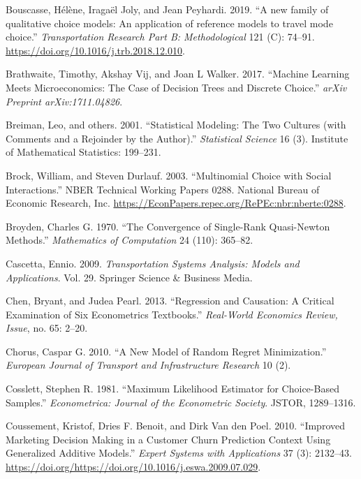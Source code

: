 \documentclass[12pt,]{article}
\begin{document}
\leavevmode\hypertarget{ref-joly2019qcm}{}%
Bouscasse, Hélène, Iragaël Joly, and Jean Peyhardi. 2019. ``A new family
of qualitative choice models: An application of reference models to
travel mode choice.'' \emph{Transportation Research Part B:
Methodological} 121 (C): 74--91.
\url{https://doi.org/10.1016/j.trb.2018.12.010}.

\leavevmode\hypertarget{ref-brathwaite2017machine}{}%
Brathwaite, Timothy, Akshay Vij, and Joan L Walker. 2017. ``Machine
Learning Meets Microeconomics: The Case of Decision Trees and Discrete
Choice.'' \emph{arXiv Preprint arXiv:1711.04826}.

\leavevmode\hypertarget{ref-breiman2001stat}{}%
Breiman, Leo, and others. 2001. ``Statistical Modeling: The Two Cultures
(with Comments and a Rejoinder by the Author).'' \emph{Statistical
Science} 16 (3). Institute of Mathematical Statistics: 199--231.

\leavevmode\hypertarget{ref-brock2003mcsi}{}%
Brock, William, and Steven Durlauf. 2003. ``Multinomial Choice with
Social Interactions.'' NBER Technical Working Papers 0288. National
Bureau of Economic Research, Inc.
\url{https://EconPapers.repec.org/RePEc:nbr:nberte:0288}.

\leavevmode\hypertarget{ref-broyden1970convergence}{}%
Broyden, Charles G. 1970. ``The Convergence of Single-Rank Quasi-Newton
Methods.'' \emph{Mathematics of Computation} 24 (110): 365--82.

\leavevmode\hypertarget{ref-cascetta2009tr}{}%
Cascetta, Ennio. 2009. \emph{Transportation Systems Analysis: Models and
Applications}. Vol. 29. Springer Science \& Business Media.

\leavevmode\hypertarget{ref-chen2013rac}{}%
Chen, Bryant, and Judea Pearl. 2013. ``Regression and Causation: A
Critical Examination of Six Econometrics Textbooks.'' \emph{Real-World
Economics Review, Issue}, no. 65: 2--20.

\leavevmode\hypertarget{ref-chorus2010rrm}{}%
Chorus, Caspar G. 2010. ``A New Model of Random Regret Minimization.''
\emph{European Journal of Transport and Infrastructure Research} 10 (2).

\leavevmode\hypertarget{ref-cosslett1981maximum}{}%
Cosslett, Stephen R. 1981. ``Maximum Likelihood Estimator for
Choice-Based Samples.'' \emph{Econometrica: Journal of the Econometric
Society}. JSTOR, 1289--1316.

\leavevmode\hypertarget{ref-coussement2010gam}{}%
Coussement, Kristof, Dries F. Benoit, and Dirk Van den Poel. 2010.
``Improved Marketing Decision Making in a Customer Churn Prediction
Context Using Generalized Additive Models.'' \emph{Expert Systems with
Applications} 37 (3): 2132--43.
\url{https://doi.org/https://doi.org/10.1016/j.eswa.2009.07.029}.
\end{document}
